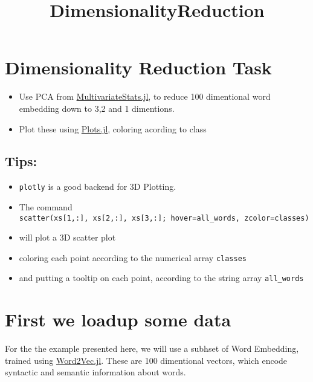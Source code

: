 \documentclass[11pt]{article}
\title{DimensionalityReduction}
\providecommand{\tightlist}{%
      \setlength{\itemsep}{0pt}\setlength{\parskip}{0pt}}
\begin{document}
    
    
    \maketitle
    
    

    
    \section{Dimensionality Reduction
Task}\label{dimensionality-reduction-task}

\begin{itemize}
\tightlist
\item
  Use PCA from
  \href{https://github.com/JuliaStats/MultivariateStats.jl}{MultivariateStats.jl},
  to reduce 100 dimentional word embedding down to 3,2 and 1 dimentions.
\item
  Plot these using
  \href{https://github.com/tbreloff/Plots.jl}{Plots.jl}, coloring
  acording to class
\end{itemize}

\subsection{Tips:}\label{tips}

\begin{itemize}
\tightlist
\item
  \texttt{plotly} is a good backend for 3D Plotting.
\item
  The command
  \texttt{scatter(xs{[}1,:{]},\ xs{[}2,:{]},\ xs{[}3,:{]};\ hover=all\_words,\ zcolor=classes)}
\item
  will plot a 3D scatter plot
\item
  coloring each point according to the numerical array \texttt{classes}
\item
  and putting a tooltip on each point, according to the string array
  \texttt{all\_words}
\end{itemize}

    \section{First we loadup some data}\label{first-we-loadup-some-data}

For the the example presented here, we will use a subhset of Word
Embedding, trained using
\href{https://github.com/tanmaykm/Word2Vec.jl}{Word2Vec.jl}. These are
100 dimentional vectors, which encode syntactic and semantic information
about words.
\end{document}
